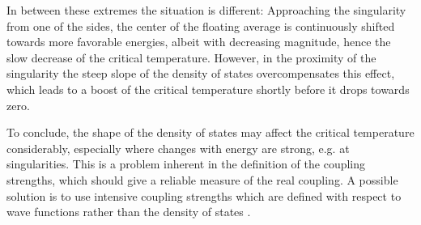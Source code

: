 In between these extremes the situation is different: Approaching the  singularity from one of the sides, the center of the floating average is
continuously shifted towards more favorable energies, albeit with decreasing
magnitude, hence the slow decrease of the critical temperature. However, in the
proximity of the  singularity the steep slope of the density of
states overcompensates this effect, which leads to a boost of the critical
temperature shortly before it drops towards zero.

To conclude, the shape of the density of states may affect the critical
temperature considerably, especially where changes with energy are strong, e.g.
at  singularities. This is a problem inherent in the definition
of the coupling strengths, which should give a reliable measure of the real
coupling. A possible solution is to use intensive coupling strengths which are
defined with respect to wave functions rather than the density of states
\cite{PickettKlein81}.
